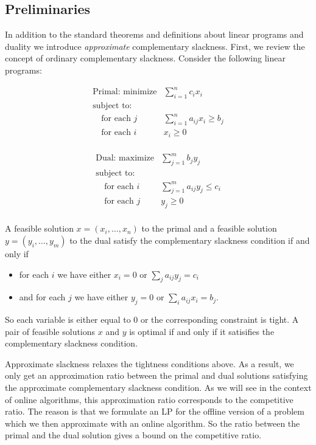\subsection{Preliminaries}
In addition to the standard theorems and definitions about linear programs and duality we introduce \emph{approximate} complementary slackness.
First, we review the concept of ordinary complementary slackness.
Consider the following linear programs:

\[
\begin{array}{lr}
  \textrm{Primal: minimize}   & \sum^n_{i=1} c_i x_i  \\
  \textrm{subject to:} & \\
  \quad \textrm{for each $j$} & \sum_{i=1}^n a_{ij} x_i \geq b_j \\
  \quad \textrm{for each $i$} & x_i \geq 0 \\
\end{array}
\]

\[
\begin{array}{lr}
  \textrm{Dual: maximize}   & \sum^m_{j=1} b_j y_j  \\
  \textrm{subject to:} & \\
  \quad \textrm{for each $i$} & \sum_{j=1}^m a_{ij} y_j \leq c_i \\
  \quad \textrm{for each $j$} & y_j \geq 0 \\
\end{array}
\]

A feasible solution $x = (x_i, \ldots, x_n)$ to the primal and a feasible solution $y = (y_i, \ldots, y_m)$ to the dual satisfy the complementary slackness condition if and only if
\begin{itemize}
\item for each $i$ we have either $x_i = 0$ or $\sum_{j} a_{ij}y_j = c_i$
\item and for each $j$ we have either $y_j = 0$ or $\sum_{i} a_{ij} x_i = b_j$.
\end{itemize}
So each variable is either equal to 0 or the corresponding constraint is tight.
A pair of feasible solutions $x$ and $y$ is optimal if and only if it satisifies the complementary slackness condition.

Approximate slackness relaxes the tightness conditions above.
As a result, we only get an approximation ratio between the primal and dual solutions satisfying the approximate complementary slackness condition.
As we will see in the context of online algorithms, this approximation ratio corresponds to the competitive ratio.
The reason is that we formulate an LP for the offline version of a problem which we then approximate with an online algorithm.
So the ratio between the primal and the dual solution gives a bound on the competitive ratio.

